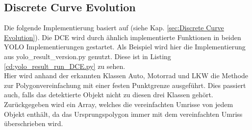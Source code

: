 \subsection{Discrete Curve Evolution}{
	\label{py:DCE}
	Die folgende Implementierung basiert auf \citeauthor{Barkowsky2000} \citep{Barkowsky2000} (siehe Kap. \ref{sec:Discrete Curve Evolution}). Die DCE wird durch ähnlich implementierte Funktionen in beiden YOLO Implementierungen gestartet. Als Beispiel wird hier die Implementierung aus yolo\_result\_version.py genutzt. Diese ist in Listing \ref{cd:yolo_result_run_DCE.py} zu sehen. \\
	Hier wird anhand der erkannten Klassen Auto, Motorrad und LKW die Methode zur Polygonvereinfachung mit einer festen Punktgrenze ausgeführt. Dies passiert auch, falls das detektierte Objekt nicht zu diesen drei Klassen gehört. \\ 
	
	Zurückgegeben wird ein Array, welches die vereinfachten Umrisse von jedem Objekt enthält, da das Ursprungspolygon immer mit dem vereinfachten Umriss überschrieben wird. \\

}
